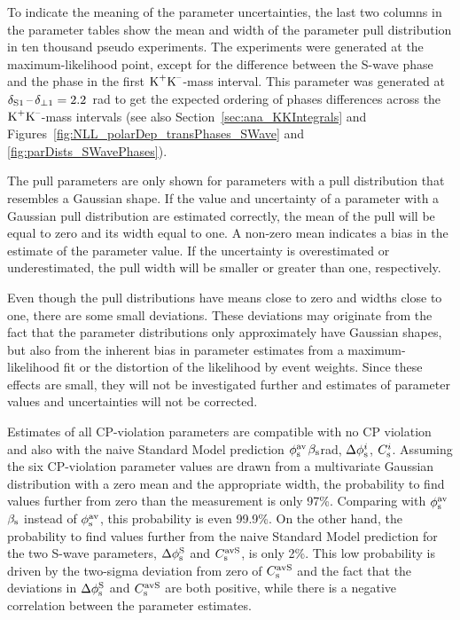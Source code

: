 To indicate the meaning of the parameter uncertainties, the last two columns in the parameter tables show the mean and width of the
parameter pull distribution in ten thousand pseudo experiments. The experiments were generated at the maximum-likelihood point, except for
the difference between the S-wave phase and the \BstoJpsiphi{} phase in the first $\KK$-mass interval. This parameter was generated at
$\delSperp[\text{1}]=2.2$~rad to get the expected ordering of phases differences across the $\KK$-mass intervals (see also
Section~\ref{sec:ana_KKIntegrals} and Figures~\ref{fig:NLL_polarDep_transPhases_SWave} and \ref{fig:parDists_SWavePhases}).

The pull parameters are only shown for parameters with a pull distribution that resembles a Gaussian shape. If the value and uncertainty of
a parameter with a Gaussian pull distribution are estimated correctly, the mean of the pull will be equal to zero and its width equal to
one. A non-zero mean indicates a bias in the estimate of the parameter value. If the uncertainty is overestimated or underestimated, the
pull width will be smaller or greater than one, respectively.

Even though the pull distributions have means close to zero and widths close to one, there are some small deviations. These deviations may
originate from the fact that the parameter distributions only approximately have Gaussian shapes, but also from the inherent bias in
parameter estimates from a maximum-likelihood fit or the distortion of the likelihood by event weights. Since these effects are small, they
will not be investigated further and estimates of parameter values and uncertainties will not be corrected.

Estimates of all CP-violation parameters are compatible with no CP violation and also with the naive Standard Model prediction
$\phisav$\texteq{}$\bs$\mbox{\textapprox{}\unitsp{}rad}, $\Delphisi$, $\Csi$. Assuming the six \BstoJpsiphi{}
CP-violation parameter values are drawn from a multivariate Gaussian distribution with a zero mean and the appropriate width, the
probability to find values further from zero than the measurement is only 97\%. Comparing with $\phisav$\texteq{}$\bs$ instead of
$\phisav$, this probability is even 99.9\%. On the other hand, the probability to find values further from the naive Standard Model
prediction for the two S-wave parameters, $\DelphisS$ and $\CsavS$, is only 2\%. This low probability is driven by the two-sigma deviation
from zero of $\CsavS$ and the fact that the deviations in $\DelphisS$ and $\CsavS$ are both positive, while there is a negative correlation
between the parameter estimates.

